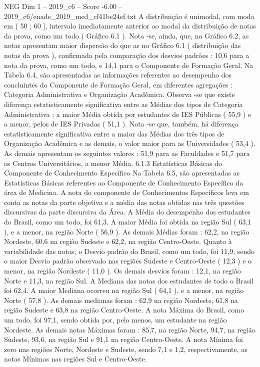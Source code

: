 \begin{textsample}{NEG Dim 1 – 2019\_c6 – Score -6.00 – 2019\_c6/enade\_2019\_med\_cf41be24ef.txt}
A distribuição é unimodal, com moda em ( 50 ; 60 ], intervalo imediatamente anterior ao modal da distribuição de notas da prova, como um todo ( Gráfico 6.1 ).
Nota -se, ainda, que, no Gráfico 6.2, as notas apresentam maior dispersão do que as no Gráfico 6.1 ( distribuição das notas da prova ), confirmada pela comparação dos desvios padrões : 10,6 para a nota da prova, como um todo, e 14,1 para o Componente de Formação Geral.
Na Tabela 6.4, são apresentadas as informações referentes ao desempenho dos concluintes do Componente de Formação Geral, em diferentes agregações : Categoria Administrativa e Organização Acadêmica.
Observa -se que existe diferença estatisticamente significativa entre as Médias dos tipos de Categoria Administrativa : a maior Média obtida por estudantes de IES Públicas ( 55,9 ) e a menor, pelos de IES Privadas ( 51,1 ).
Nota -se que, também, há diferença estatisticamente significativa entre a maior das Médias dos três tipos de Organização Acadêmica e as demais, o valor maior para as Universidades ( 53,4 ).
As demais apresentam os seguintes valores : 51,9 para as Faculdades e 51,7 para os Centros Universitários, a menor Média. 6.1.3 Estatísticas Básicas do Componente de Conhecimento Específico Na Tabela 6.5, são apresentadas as Estatísticas Básicas referentes ao Componente de Conhecimento Específico da área de Medicina.
A nota do componente de Conhecimentos Específicos leva em conta as notas da parte objetiva e a média das notas obtidas nas três questões discursivas da parte discursiva da Área.
A Média do desempenho dos estudantes do Brasil, como um todo, foi 61,3.
A maior Média foi obtida na região Sul ( 63,1 ), e a menor, na região Norte ( 56,9 ).
As demais Médias foram : 62,2, na região Nordeste, 60,6 na região Sudeste e 62,2, na região Centro-Oeste.
Quanto à variabilidade das notas, o Desvio padrão do Brasil, como um todo, foi 11,9, sendo o maior Desvio padrão observado nas regiões Sudeste e Centro-Oeste ( 12,3 ) e o menor, na região Nordeste ( 11,0 ).
Os demais desvios foram : 12,1, na região Norte e 11,3, na região Sul.
A Mediana das notas dos estudantes de todo o Brasil foi 62,4.
A maior Mediana ocorreu na região Sul ( 64,1 ), e a menor, na região Norte ( 57,8 ).
As demais medianas foram : 62,9 na região Nordeste, 61,8 na região Sudeste e 63,8 na região Centro-Oeste.
A nota Máxima do Brasil, como um todo, foi 97,1, sendo obtida por, pelo menos, um estudante na região Nordeste.
As demais notas Máximas foram : 85,7, na região Norte, 94,7, na região Sudeste, 93,6, na região Sul e 91,1 na região Centro-Oeste.
A nota Mínima foi zero nas regiões Norte, Nordeste e Sudeste, sendo 7,1 e 1,2, respectivamente, as notas Mínimas nas regiões Sul e Centro-Oeste.

\end{textsample}
